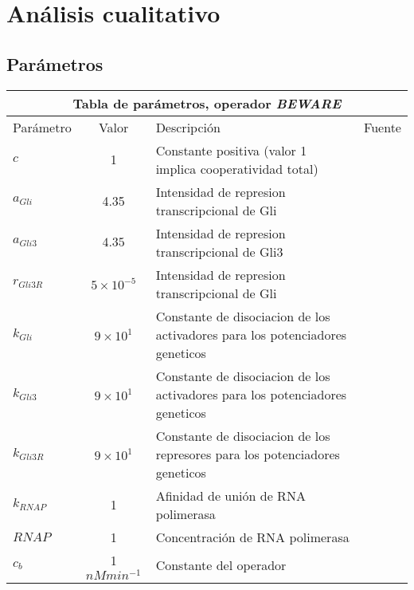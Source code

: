 \chapter{Análisis cualitativo}

\label{ch:simulation}

\section{Parámetros}

\begin{center}

\begin{tabular}{ |p{3cm}||c|p{3cm}|p{3cm}|  }
	\hline
	\multicolumn{4}{|c|}{Tabla de parámetros, operador \textit{BEWARE}} \\
	\hline
	Parámetro & Valor & Descripción & Fuente\\
	\hline
	$c $  & 1    &\tiny{Constante positiva (valor 1 implica cooperatividad total)} &   \cite{cambon1}\\
	$a_{Gli}$ &   4.35  & \tiny{Intensidad de represion transcripcional de Gli}   & \cite{cambon1}\\
	$a_{Gli3} $ & $4.35$ & \tiny{ Intensidad de represion transcripcional de Gli3 } &  \cite{cambon1}\\
	$r_{Gli3R}$   &$5\times10^{-5}$ & \tiny{ Intensidad de represion transcripcional de Gli } &  \cite{cambon1}\\
	$k_{Gli}$ &  $9\times10^{1}$  & \tiny{ Constante de disociacion de los activadores para los potenciadores geneticos } & \cite{cambon1}\\
	$k_{Gli3}$ & $9\times10^{1}$  & \tiny{ Constante de disociacion de los activadores para los potenciadores geneticos }   & \cite{cambon1}\\
	$k_{Gli3R}$ & $9\times10^{1}$ & \tiny{ Constante de disociacion de los represores para los potenciadores geneticos }   & \cite{cambon1}\\
	
	$k_{RNAP}$& 1  &  \tiny{Afinidad de unión   de RNA polimerasa} & \cite{cambon1}\\
	$RNAP$& 1  & \tiny{Concentración de RNA polimerasa} & \cite{cambon1}\\
	$c_b$& 1 $ nMmin^{-1}$  & \tiny{ Constante del operador} & \cite{cambon1}\\
	\hline
\end{tabular}

\end{center}


